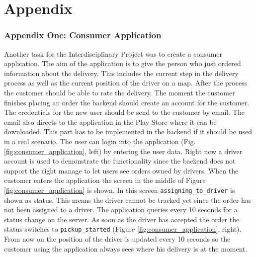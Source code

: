 \part*{Appendix}
\renewcommand{\thesection}{\arabic{section}}
\renewcommand{\theequation}{\arabic{equation}}
\section{Appendix One: Consumer Application}\label{section:Appendix One: Consumer Application}

Another task for the Interdisciplinary Project was to create a consumer application. The aim of the application is to give the person who just ordered information about the delivery. This includes the current step in the delivery process as well as the current position of the driver on a map. After the process the customer should be able to rate the delivery.\newline
The moment the customer finishes placing an order the backend should create an account for the customer. The credentials for the new user should be send to the customer by email. The email also directs to the application in the Play Store where it can be downloaded. This part has to be implemented in the backend if it should be used in a real scenario.\newline
The user can login into the application (Fig. \ref{fig:consumer_application}, left) by entering the user data. Right now a driver account is used to demonstrate the functionality since the backend does not support the right manage to let users see orders owned by drivers.\newline
When the customer enters the application the screen in the middle of Figure \ref{fig:consumer_application} is shown. In this screen \texttt{assigning\_to\_driver} is shown as status. This means the driver cannot be tracked yet since the order has not been assigned to a driver. The application queries every 10 seconds for a status change on the server. As soon as the driver has accepted the order the status switches to \texttt{pickup\_started} (Figure \ref{fig:consumer_application}, right). From now on the position of the driver is updated every 10 seconds so the customer using the application always sees where his delivery is at the moment.
